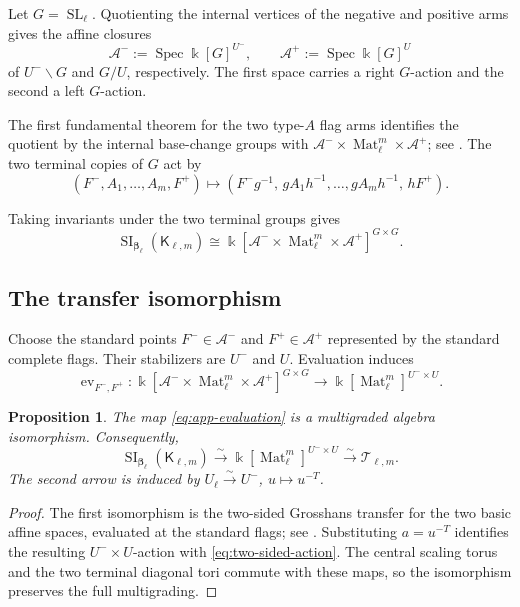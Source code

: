 \documentclass[11pt]{amsart}
\newtheorem{proposition}[theorem]{Proposition}
\theoremstyle{definition}
\theoremstyle{remark}
\newcommand{\kk}{\Bbbk}
\newcommand{\cT}{\mathcal T}
\newcommand{\Mat}{\operatorname{Mat}}
\newcommand{\SL}{\operatorname{SL}}
\newcommand{\SI}{\operatorname{SI}}
\begin{document}
Let $G=\SL_\ell$.  Quotienting the internal vertices of the negative and
positive arms gives the affine closures
\[ \mathcal A^-:=\operatorname{Spec}\kk[G]^{U^-}, \qquad \mathcal A^+:=\operatorname{Spec}\kk[G]^U \]
of $U^-\backslash G$ and $G/U$, respectively.  The first space carries a
right $G$-action and the second a left $G$-action.

The first fundamental theorem for the two type-$A$ flag arms identifies
the quotient by the internal base-change groups with
$\mathcal A^-\times\Mat_\ell^m\times\mathcal A^+$; see
\cite{Grosshans,DerksenWeyman}.  The two terminal copies of $G$ act by
\[ (F^-,A_1,\ldots,A_m,F^+) \longmapsto (F^-g^{-1},\,gA_1h^{-1},\ldots,gA_mh^{-1},\,hF^+). \]

Taking invariants under the two terminal groups gives
\[ \SI_{\boldsymbol\beta_\ell}(\mathsf K_{\ell,m}) \cong \kk[\mathcal A^-\times\Mat_\ell^m\times\mathcal A^+]^{G\times G}. \]

\subsection{The transfer isomorphism}

Choose the standard points $F^-\in\mathcal A^-$ and
$F^+\in\mathcal A^+$ represented by the standard complete flags.  Their
stabilizers are $U^-$ and $U$.  Evaluation induces
\begin{equation}
 \operatorname{ev}_{F^-,F^+}:
 \kk[\mathcal A^-\times\Mat_\ell^m\times\mathcal A^+]^{G\times G}
 \longrightarrow
 \kk[\Mat_\ell^m]^{U^-\times U}.
 \label{eq:app-evaluation}
\end{equation}

\begin{proposition}\label{prop:app-transfer}
The map \eqref{eq:app-evaluation} is a multigraded algebra isomorphism.
Consequently,
\begin{equation}
 \SI_{\boldsymbol\beta_\ell}(\mathsf K_{\ell,m})
 \xrightarrow{\sim} \kk[\Mat_\ell^m]^{U^-\times U}
 \xrightarrow{\sim} \cT_{\ell,m}.
 \label{eq:app-transfer-final}
\end{equation}
The second arrow is induced by
$U_\ell\xrightarrow{\sim}U^-$, $u\mapsto u^{-T}$.
\end{proposition}

\begin{proof}
The first isomorphism is the two-sided Grosshans transfer for the two basic
affine spaces, evaluated at the standard flags; see \cite{Grosshans}.
Substituting $a=u^{-T}$ identifies the resulting $U^-\times U$-action with
\eqref{eq:two-sided-action}.  The central scaling torus and the two terminal
diagonal tori commute with these maps, so the isomorphism preserves the full
multigrading.
\end{proof}
\end{document}
